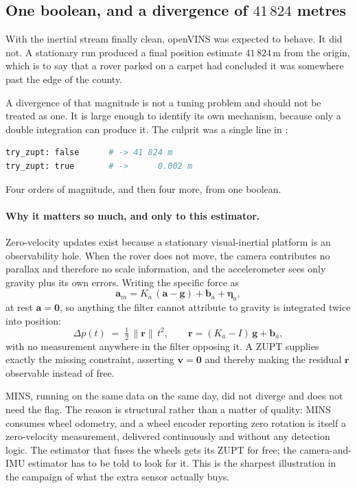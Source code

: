 \subsection{One boolean, and a divergence of $41\,824$ metres}
\label{sec:july28zupt}

With the inertial stream finally clean, openVINS was expected to behave. It
did not. A stationary run produced a final position estimate $41\,824$\,m
from the origin, which is to say that a rover parked on a carpet had
concluded it was somewhere past the edge of the county.

A divergence of that magnitude is not a tuning problem and should not be
treated as one. It is large enough to identify its own mechanism, because
only a double integration can produce it. The culprit was a single line in
:
\begin{lstlisting}[language=bash]
try_zupt: false      # -> 41 824 m
try_zupt: true       # ->      0.002 m
\end{lstlisting}
Four orders of magnitude, and then four more, from one boolean.

\paragraph{Why it matters so much, and only to this estimator.}
Zero-velocity updates exist because a stationary visual-inertial platform is
an observability hole. When the rover does not move, the camera contributes
no parallax and therefore no scale information, and the accelerometer sees
only gravity plus its own errors. Writing the specific force as
\begin{equation}
\mathbf{a}_m = K_a\,(\mathbf{a} - \mathbf{g}) + \mathbf{b}_a
             + \boldsymbol{\eta}_a ,
\label{eq:july28specific}
\end{equation}
at rest $\mathbf{a} = \mathbf{0}$, so anything the filter cannot attribute to
gravity is integrated twice into position:
\begin{equation}
\Delta p(t) \;=\; \tfrac{1}{2}\,\lVert \mathbf{r} \rVert\,t^{2},
\qquad
\mathbf{r} = (K_a - I)\,\mathbf{g} + \mathbf{b}_a ,
\label{eq:july28doubleint}
\end{equation}
with no measurement anywhere in the filter opposing it. A ZUPT supplies
exactly the missing constraint, asserting $\mathbf{v} = \mathbf{0}$ and
thereby making the residual $\mathbf{r}$ observable instead of free.

MINS, running on the same data on the same day, did not diverge and does not
need the flag. The reason is structural rather than a matter of quality:
MINS consumes wheel odometry, and a wheel encoder reporting zero rotation is
itself a zero-velocity measurement, delivered continuously and without any
detection logic. The estimator that fuses the wheels gets its ZUPT for free;
the camera-and-IMU estimator has to be told to look for it. This is the
sharpest illustration in the campaign of what the extra sensor actually buys.

